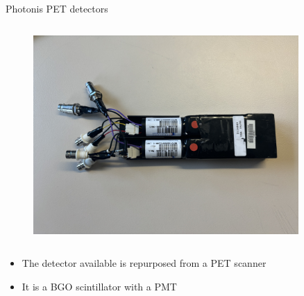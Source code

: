 \begin{columnframe}{Photonis PET detectors}
    \begin{column}{0.5\textwidth}
        \begin{figure}
            \centering
            \includegraphics[width=0.9\textwidth, frame]{images/photonis_teardown_1.JPG}
        \end{figure}
    \end{column}
    \begin{column}{0.5\textwidth}
        \begin{itemize}
            \item The detector available is repurposed from a PET scanner
            \item It is a BGO scintillator with a PMT
        \end{itemize}
    \end{column}
\end{columnframe}

